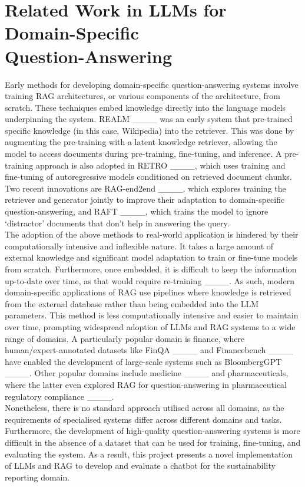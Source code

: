 \section{Related Work in LLMs for Domain-Specific \\Question-Answering}
Early methods for developing domain-specific question-answering systems involve training RAG architectures, or various components of the architecture, from scratch. These techniques embed knowledge directly into the language models underpinning the system. REALM ____ was an early system that pre-trained specific knowledge (in this case, Wikipedia) into the retriever. This was done by augmenting the pre-training with a latent knowledge retriever, allowing the model to access documents during pre-training, fine-tuning, and inference. A pre-training approach is also adopted in RETRO ____, which uses training and fine-tuning of autoregressive models conditioned on retrieved document chunks. Two recent innovations are RAG-end2end ____, which explores training the retriever and generator jointly to improve their adaptation to domain-specific question-answering, and RAFT ____, which trains the model to ignore `distractor' documents that don't help in answering the query. \\


The adoption of the above methods to real-world application is hindered by their computationally intensive and inflexible nature. It takes a large amount of external knowledge and significant model adaptation to train or fine-tune models from scratch. Furthermore, once embedded, it is difficult to keep the information up-to-date over time, as that would require re-training ____. As such, modern domain-specific applications of RAG use pipelines where knowledge is retrieved from the external database rather than being embedded into the LLM parameters. This method is less computationally intensive and easier to maintain over time, prompting widespread adoption of LLMs and RAG systems to a wide range of domains. A particularly popular domain is finance, where human/expert-annotated datasets like FinQA ____ and Financebench ____ have enabled the development of large-scale systems such as BloombergGPT ____. Other popular domains include medicine ____ and pharmaceuticals, where the latter even explored RAG for question-answering in pharmaceutical regulatory compliance ____. \\


Nonetheless, there is no standard approach utilised across all domains, as the requirements of specialised systems differ across different domains and tasks. Furthermore, the development of high-quality question-answering systems is more difficult in the absence of a dataset that can be used for training, fine-tuning, and evaluating the system. As a result, this project presents a novel implementation of LLMs and RAG to develop and evaluate a chatbot for the sustainability reporting domain.